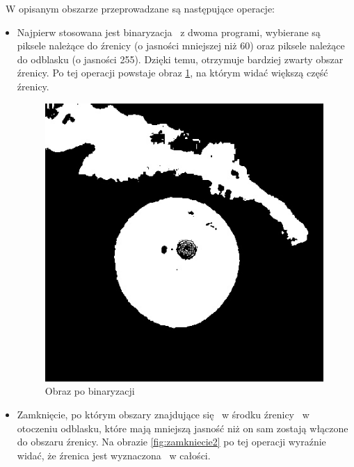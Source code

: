 ~W opisanym obszarze przeprowadzane są następujące operacje:
\begin{itemize}
\item Najpierw stosowana jest binaryzacja ~z dwoma programi, wybierane są piksele należące do źrenicy (o jasności mniejszej niż 60) oraz piksele należące do odblasku (o jasności 255). Dzięki temu, otrzymuje bardziej zwarty obszar źrenicy. Po tej operacji powstaje obraz \ref{fig:binaryzacja2}, na którym widać większą część źrenicy.
\begin{figure}
\begin{center}
\includegraphics[scale=0.5]{binaryzacja2.jpg}
\caption{Obraz po binaryzacji}
\label{fig:binaryzacja2}
\end{center}
\end{figure}
\item Zamknięcie, po którym obszary znajdujące się ~w środku źrenicy ~w otoczeniu odblasku, które mają mniejszą jasność niż on sam zostają włączone do obszaru źrenicy. Na obrazie \ref{fig:zamkniecie2} po tej operacji wyraźnie widać, że źrenica jest wyznaczona ~w całości.
\begin{figure}
\begin{center}

\end{center}
\end{figure}
\end{itemize}
